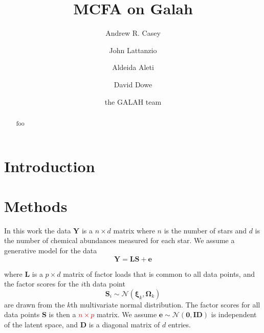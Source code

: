 \documentclass[twocolumn]{aastex61}
\newcommand{\todo}[1]{\textcolor{red}{#1}}
\newcommand{\vect}[1]{\boldsymbol{\mathbf{#1}}}
\renewcommand{\vec}[1]{\vect{#1}}
\newcommand{\data}{\textbf{Y}}
\newcommand{\vecdata}{\vec\data}
\newcommand{\eye}{\textbf{I}}
\newcommand{\factorloads}{\textbf{L}}
\newcommand{\factorscores}{\textbf{S}}
\newcommand{\specificvariance}{\vec{D}}
\begin{document}
\title{MCFA on Galah}


\author[0000-0003-0174-0564]{Andrew R. Casey}
			 
\author{John Lattanzio}

\author{Aldeida Aleti}

\author{David Dowe}

\author{the GALAH team}


\begin{abstract}
foo
\end{abstract}



\section{Introduction} \label{sec:intro}

\section{Methods} \label{sec:methods}



In this work the data $\vecdata$ is a $n \times d$ matrix 
where $n$ is the number of stars and $d$ is the number of
chemical abundances measured for each star. We assume a
generative model for the data 
\begin{equation}
	\vecdata = \factorloads\factorscores + \vec{e}
	\label{eq:generative-model}
\end{equation}

\noindent{}where $\factorloads$ is a $p \times d$ matrix of factor
loads that is common to all data points, and the factor scores for
the $i$th data point
\begin{equation}
	\factorscores_i \sim \mathcal{N}(\vec\xi_k, \vec\Omega_k)
\end{equation}
\noindent{}are drawn from the $k$th multivariate  normal distribution.
The factor scores for all data points $\factorscores$ is then a 
\todo{$n \times p$} matrix.
 We assume $\vec{e} \sim \mathcal{N}\left(\vec{0}, \eye\specificvariance\right)$
is independent of the latent space, and $\specificvariance$ is a
diagonal matrix of $d$ entries. 
\end{document}
